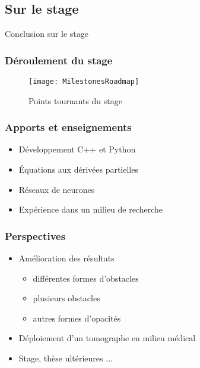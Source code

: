 \subsection{Sur le stage}

\begin{frame}
    \large
    \centering
    Conclusion sur le stage
\end{frame}

\begin{frame}
    \frametitle{Déroulement du stage}
    \begin{figure}
        \texttt{[image: MilestonesRoadmap]}       
        \caption{Points tournants du stage}
    \end{figure}
\end{frame}

\begin{frame}
    \frametitle{Apports et enseignements}
    \begin{itemize}[<+>]
        \item Développement C++ et Python   %
        \item Équations aux dérivées partielles %
        \item Réseaux de neurones %
        \item Expérience dans un milieu de recherche %
    \end{itemize}
\end{frame}

\begin{frame}
    \frametitle{Perspectives}
    \begin{itemize}
        \item<1-> Amélioration des résultats 
        \begin{itemize}
            \item<1-> différentes formes d'obstacles
            \item<2-> plusieurs obstacles
            \item<3-> autres formes d'opacités
        \end{itemize} 
        \item<4-> Déploiement d'un tomographe en milieu médical
        \item<5> Stage, thèse ultérieures ...
    \end{itemize}
\end{frame}

% 
